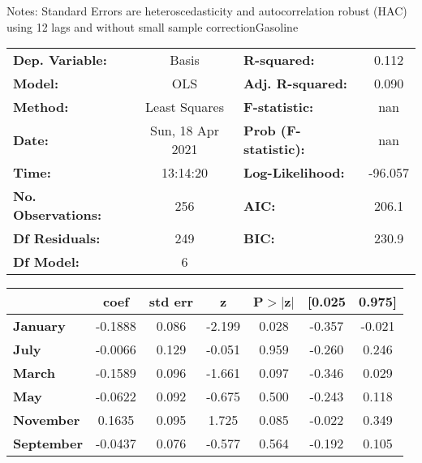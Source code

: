 Notes: \newline
 [1] Standard Errors are heteroscedasticity and autocorrelation robust (HAC) using 12 lags and without small sample correctionGasoline\begin{center}
\begin{tabular}{lclc}
\toprule
\textbf{Dep. Variable:}    &      Basis       & \textbf{  R-squared:         } &     0.112   \\
\textbf{Model:}            &       OLS        & \textbf{  Adj. R-squared:    } &     0.090   \\
\textbf{Method:}           &  Least Squares   & \textbf{  F-statistic:       } &       nan   \\
\textbf{Date:}             & Sun, 18 Apr 2021 & \textbf{  Prob (F-statistic):} &      nan    \\
\textbf{Time:}             &     13:14:20     & \textbf{  Log-Likelihood:    } &   -96.057   \\
\textbf{No. Observations:} &         256      & \textbf{  AIC:               } &     206.1   \\
\textbf{Df Residuals:}     &         249      & \textbf{  BIC:               } &     230.9   \\
\textbf{Df Model:}         &           6      & \textbf{                     } &             \\
\bottomrule
\end{tabular}
\begin{tabular}{lcccccc}
                   & \textbf{coef} & \textbf{std err} & \textbf{z} & \textbf{P$> |$z$|$} & \textbf{[0.025} & \textbf{0.975]}  \\
\midrule
\textbf{January}   &      -0.1888  &        0.086     &    -2.199  &         0.028        &       -0.357    &       -0.021     \\
\textbf{July}      &      -0.0066  &        0.129     &    -0.051  &         0.959        &       -0.260    &        0.246     \\
\textbf{March}     &      -0.1589  &        0.096     &    -1.661  &         0.097        &       -0.346    &        0.029     \\
\textbf{May}       &      -0.0622  &        0.092     &    -0.675  &         0.500        &       -0.243    &        0.118     \\
\textbf{November}  &       0.1635  &        0.095     &     1.725  &         0.085        &       -0.022    &        0.349     \\
\textbf{September} &      -0.0437  &        0.076     &    -0.577  &         0.564        &       -0.192    &        0.105     \\

\end{tabular}
\end{center}
